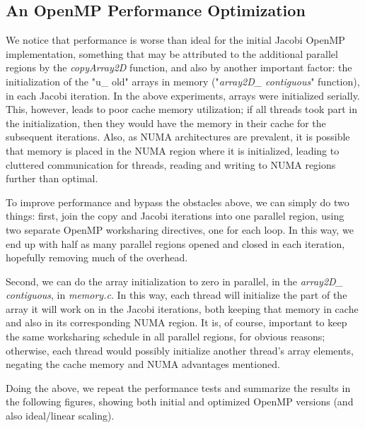 \documentclass[11pt]{report}
\begin{document}
\newpage

\subsection{An OpenMP Performance Optimization}
We notice that performance is worse than ideal for the initial Jacobi OpenMP implementation, something that may be attributed to the additional parallel regions by the \emph{copyArray2D} function, and also by another important factor: the initialization of the "u\_ old" arrays in memory ("\emph{array2D\_ contiguous}" function), in each Jacobi iteration. In the above experiments, arrays were initialized serially. This, however, leads to poor cache memory utilization; if all threads took part in the initialization, then they would have the memory in their cache for the subsequent iterations. Also, as NUMA architectures are prevalent, it is possible that memory is placed in the NUMA region where it is initialized, leading to cluttered communication for threads, reading and writing to NUMA regions further than optimal.
\newline

To improve performance and bypass the obstacles above, we can simply do two things: first, join the copy and Jacobi iterations into one parallel region, using two separate OpenMP worksharing directives, one for each loop. In this way, we end up with half as many parallel regions opened and closed in each iteration, hopefully removing much of the overhead.
\newline

Second, we can do the array initialization to zero in parallel, in the \emph{array2D\_ contiguous}, in \emph{memory.c}. In this way, each thread will initialize the part of the array it will work on in the Jacobi iterations, both keeping that memory in cache and also in its corresponding NUMA region. It is, of course, important to keep the same worksharing schedule in all parallel regions, for obvious reasons; otherwise, each thread would possibly initialize another thread's array elements, negating the cache memory and NUMA advantages mentioned.
\newline

Doing the above, we repeat the performance tests and summarize the results in the following figures, showing both initial and optimized OpenMP versions (and also ideal/linear scaling).
\end{document}
